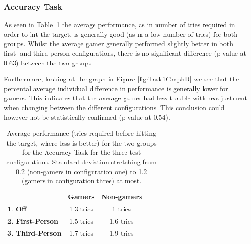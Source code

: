 \documentclass[runningheads,a4paper,oribibl]{llncs}
\begin{document}
\subsubsection{Accuracy Task}
As seen in Table~\ref{tab:Task1GraphP} the average performance, as in number of tries required in order to hit the target, is generally good (as in a low number of tries) for both groups. Whilst the average gamer generally performed slightly better in both first- and third-person configurations, there is no significant difference (p-value at 0.63) between the two groups.

Furthermore, looking at the graph in Figure \ref{fig:Task1GraphD} we see that the percental average individual difference in performance is generally lower for gamers. This indicates that the average gamer had less trouble with readjustment when changing between the different configurations. This conclusion could however not be statistically confirmed (p-value at 0.54).


\begin{table}[]
\centering

\setlength{\tabcolsep}{1em}
\def\arraystretch{1.8}
\begin{tabular}{l|c|cll}
                      & {\textbf{Gamers}} & {\textbf{Non-gamers}} &  &  \\ \cline{1-3}
\textbf{1. Off}          & 1.3 tries                                   & 1 tries                                          &  &  \\ \cline{1-3}
\textbf{2. First-Person} & 1.5 tries                                    & 1.6 tries                                        &  &  \\ \cline{1-3}
\textbf{3. Third-Person} & 1.7 tries                                    & 1.9 tries                                        &  & 
\end{tabular}
\caption{Average performance (tries required before hitting the target, where less is better) for the two groups for the Accuracy Task for the three test configurations. Standard deviation stretching from 0.2 (non-gamers in configuration one) to 1.2 (gamers in configuration three) at most.}
\label{tab:Task1GraphP}
\end{table}




\end{document}
